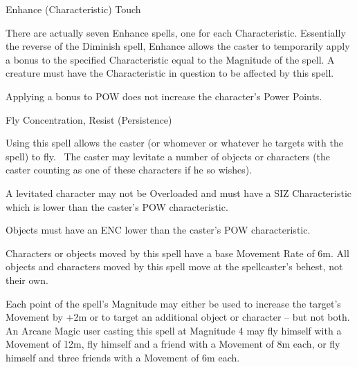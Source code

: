 \begin{rpg-spell}
{Enhance (Characteristic)}
{Touch}

There are actually seven Enhance spells, one for each Characteristic. Essentially the reverse of the Diminish spell, Enhance allows the caster to temporarily apply a bonus to the specified Characteristic equal to the Magnitude of the spell. A creature must have the Characteristic in question to be affected by this spell. 

Applying a bonus to POW does not increase the character’s Power Points. 
\end{rpg-spell}


\begin{rpg-spell}
{Fly}
{Concentration, Resist (Persistence)}

Using this spell allows the caster (or whomever or whatever he targets with the spell) to fly.  The caster may levitate a number of objects or characters (the caster counting as one of these characters if he so wishes). 

A levitated character may not be Overloaded and must have a SIZ Characteristic which is lower than the caster’s POW characteristic. 

Objects must have an ENC lower than the caster’s POW characteristic. 

Characters or objects moved by this spell have a base Movement Rate of 6m. All objects and characters moved by this spell move at the spellcaster’s behest, not their own. 

Each point of the spell’s Magnitude may either be used to increase the target’s Movement by +2m or to target an additional object or character – but not both. An Arcane Magic user casting this spell at Magnitude 4 may fly himself with a Movement of 12m, fly himself and a friend with a Movement of 8m each, or fly himself and three friends with a Movement of 6m each.
\end{rpg-spell}


